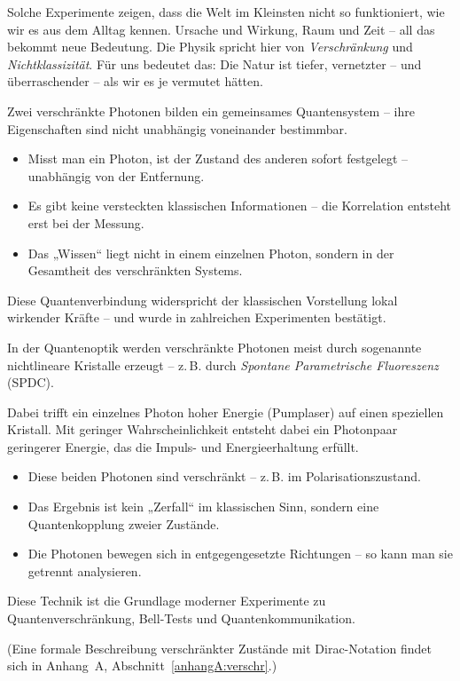 Solche Experimente zeigen, dass die Welt im Kleinsten nicht so funktioniert, wie wir es aus dem Alltag kennen. Ursache und Wirkung, Raum und Zeit – all das bekommt neue Bedeutung. Die Physik spricht hier von \textit{Verschränkung} und \textit{Nichtklassizität}. Für uns bedeutet das: Die Natur ist tiefer, vernetzter – und überraschender – als wir es je vermutet hätten.
\
\vspace{1em}
\begin{tcolorbox}[didaktikbox, title=Was bedeutet Verschränkung?]
	\label{box:verschr}
	Zwei verschränkte Photonen bilden ein gemeinsames Quantensystem – ihre Eigenschaften sind nicht unabhängig voneinander bestimmbar.
	
	\begin{itemize}
		\item Misst man ein Photon, ist der Zustand des anderen sofort festgelegt – unabhängig von der Entfernung.
		\item Es gibt keine versteckten klassischen Informationen – die Korrelation entsteht erst bei der Messung.
		\item Das „Wissen“ liegt nicht in einem einzelnen Photon, sondern in der Gesamtheit des verschränkten Systems.
	\end{itemize}
	
	Diese Quantenverbindung widerspricht der klassischen Vorstellung lokal wirkender Kräfte – und wurde in zahlreichen Experimenten bestätigt.
\end{tcolorbox}
\vspace{1em}
\begin{tcolorbox}[physikbox, title=Wie entstehen verschränkte Photonen?]
	\label{box:spdc}
	In der Quantenoptik werden verschränkte Photonen meist durch sogenannte nichtlineare Kristalle erzeugt – z.\,B. durch \emph{Spontane Parametrische Fluoreszenz} (SPDC).
	
	Dabei trifft ein einzelnes Photon hoher Energie (Pumplaser) auf einen speziellen Kristall. Mit geringer Wahrscheinlichkeit entsteht dabei ein Photonpaar geringerer Energie, das die Impuls- und Energieerhaltung erfüllt.
	
	\begin{itemize}
		\item Diese beiden Photonen sind verschränkt – z.\,B. im Polarisationszustand.
		\item Das Ergebnis ist kein „Zerfall“ im klassischen Sinn, sondern eine Quantenkopplung zweier Zustände.
		\item Die Photonen bewegen sich in entgegengesetzte Richtungen – so kann man sie getrennt analysieren.
	\end{itemize}
	
	Diese Technik ist die Grundlage moderner Experimente zu Quantenverschränkung, Bell-Tests und Quantenkommunikation.
\end{tcolorbox}
(Eine formale Beschreibung verschränkter Zustände mit Dirac-Notation findet sich in Anhang~A, Abschnitt~\ref{anhangA:verschr}.)

